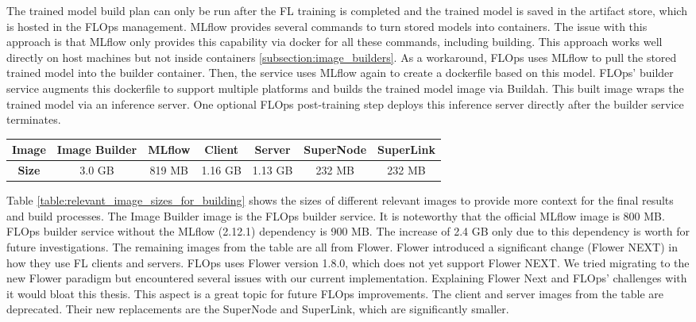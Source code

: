 The trained model build plan can only be run after the FL training is completed and the trained model is saved in the artifact store, which is hosted in the FLOps management.
MLflow provides several commands to turn stored models into containers.
The issue with this approach is that MLflow only provides this capability via docker for all these commands, including building.
This approach works well directly on host machines but not inside containers \ref{subsection:image_builders}.
As a workaround, FLOps uses MLflow to pull the stored trained model into the builder container.
Then, the service uses MLflow again to create a dockerfile based on this model.
FLOps' builder service augments this dockerfile to support multiple platforms and builds the trained model image via Buildah.
This built image wraps the trained model via an inference server.
One optional FLOps post-training step deploys this inference server directly after the builder service terminates.

\begin{changemargin}{0cm}{0cm}
    \centering
    \begin{tabular}{|c||c|c|c|c|c|c|}
        \hline
            \textbf{Image} & Image Builder & MLflow & Client & Server & SuperNode & SuperLink \\
        \hline
            \textbf{Size} & 3.0 GB & 819 MB & 1.16 GB & 1.13 GB & 232 MB & 232 MB
        \\
        \hline
    \end{tabular}
    \label{table:relevant_image_sizes_for_building}
\end{changemargin}
Table \ref{table:relevant_image_sizes_for_building} shows the sizes of different relevant images to provide more context for the final results and build processes.
The Image Builder image is the FLOps builder service.
It is noteworthy that the official MLflow image is 800 MB.
FLOps builder service without the MLflow (2.12.1) dependency is 900 MB.
The increase of 2.4 GB only due to this dependency is worth for future investigations.
The remaining images from the table are all from Flower.
Flower introduced a significant change (Flower NEXT) in how they use FL clients and servers.
FLOps uses Flower version 1.8.0, which does not yet support Flower NEXT.
We tried migrating to the new Flower paradigm but encountered several issues with our current implementation.
Explaining Flower Next and FLOps' challenges with it would bloat this thesis.
This aspect is a great topic for future FLOps improvements.
The client and server images from the table are deprecated.
Their new replacements are the SuperNode and SuperLink, which are significantly smaller.

